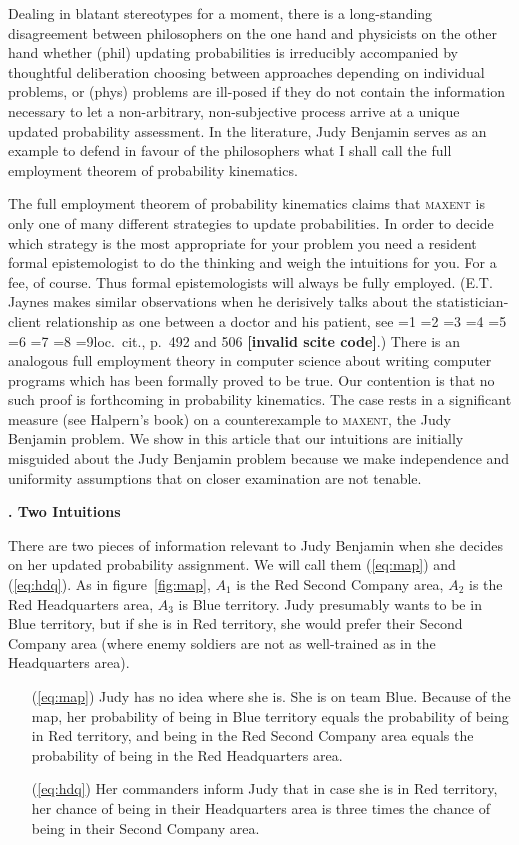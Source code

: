 \documentclass[12pt]{article}
\newcommand{\kapt}[1]{\noindent \textbf{{\thechap}. #1}\addtocounter{chap}{1}}
\newif\ifNumericalOrYear
\newcommand{\PageP}{p.~}
\newcommand{\PageP}{}
\newcommand{\nias}{\noindent} %
\newcommand{\scite}[3]{\ifnum#1=1\ifNumericalOrYear\citep{#2}\else\citeyearpar{#2}\fi\else
\ifnum#1=2\ifNumericalOrYear\citep[#3]{#2}\else\citep[{\PageP}#3]{#2}\fi\else
\ifnum#1=3\ifNumericalOrYear(\citet[#3]{#2})\else\citep[{\PageP}#3]{#2}\fi\else
\ifnum#1=4\ifNumericalOrYear\citet{#2}\else\citet{#2}\fi\else
\ifnum#1=5\ifNumericalOrYear(\citet{#2})\else\citep{#2}\fi\else
\ifnum#1=6\ifNumericalOrYear(\citet[#3]{#2})\else\citep[{\PageP}#3]{#2}\fi\else
\ifnum#1=7\ifNumericalOrYear\citep{#2}\else\citealp{#2}\fi\else
\ifnum#1=8\ifNumericalOrYear\citep[#3]{#2}\else\citealp[{\PageP}#3]{#2}\fi\else
\ifnum#1=9\ifNumericalOrYear\citep[#3]{#2}\else{}loc.\ cit., {\PageP}#3\fi\else
\textbf{[invalid scite code]}\fi\fi\fi\fi\fi\fi\fi\fi\fi}
\begin{document}
Dealing in blatant stereotypes for a moment, there is a long-standing
disagreement between philosophers on the one hand and physicists on
the other hand whether (phil) updating probabilities is irreducibly
accompanied by thoughtful deliberation choosing between approaches
depending on individual problems, or (phys) problems are ill-posed if
they do not contain the information necessary to let a non-arbitrary,
non-subjective process arrive at a unique updated probability
assessment. In the literature, Judy Benjamin serves as an example to
defend in favour of the philosophers what I shall call the full
employment theorem of probability kinematics.

The full employment theorem of probability kinematics claims that
\textsc{maxent} is only one of many different strategies to update
probabilities. In order to decide which strategy is the most
appropriate for your problem you need a resident formal epistemologist
to do the thinking and weigh the intuitions for you. For a fee, of
course. Thus formal epistemologists will always be fully employed.
(E.T. Jaynes makes similar observations when he derisively talks about
the statistician-client relationship as one between a doctor and his
patient, see \scite{8}{jaynes98}{492 and 506}.) There is an analogous
full employment theory in computer science about writing computer
programs which has been formally proved to be true. Our contention is
that no such proof is forthcoming in probability kinematics. The case
rests in a significant measure (see Halpern's book) on a
counterexample to \textsc{maxent}, the Judy Benjamin problem. We show
in this article that our intuitions are initially misguided about the
Judy Benjamin problem because we make independence and uniformity
assumptions that on closer examination are not tenable.

\medskip

\kapt{Two Intuitions}

\nias There are two pieces of information relevant to Judy Benjamin
when she decides on her updated probability assignment. We will call
them ({\ref{eq:map}}) and ({\ref{eq:hdq}}). As in
figure~\ref{fig:map}, $A_{1}$ is the Red Second Company area, $A_{2}$ is
the Red Headquarters area, $A_{3}$ is Blue territory. Judy presumably
wants to be in Blue territory, but if she is in Red territory, she
would prefer their Second Company area (where enemy soldiers are not
as well-trained as in the Headquarters area).

\begin{enumerate}
\item[({\ref{eq:map}})] Judy has no idea where she is. She is on team Blue.
  Because of the map, her probability of being in Blue territory
  equals the probability of being in Red territory, and being in the Red
  Second Company area equals the probability of being in the Red
  Headquarters area.
\item[({\ref{eq:hdq}})] Her commanders inform Judy that in case she is in Red
  territory, her chance of being in their Headquarters area is three
  times the chance of being in their Second Company area.
\end{enumerate}
\end{document}
